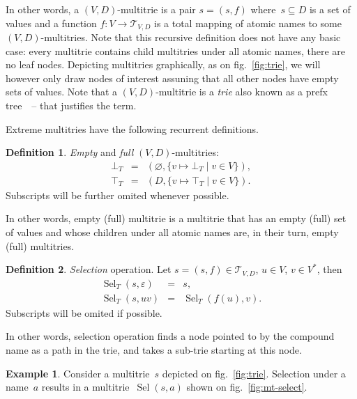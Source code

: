 \documentclass{article}
\theoremstyle{definition}
\newtheorem{Df}{Definition}
\newtheorem{Ex}{Example}
\newcommand{\setcharmt}{T}
\newcommand{\setsymbol}[3]{\mathcal{#1}_{#2,#3}}
\newcommand{\setmt}[2]{\setsymbol{\setcharmt}{#1}{#2}}
\newcommand{\select}{\operatorname{Sel}}
\begin{document}

In other words, a $(V,D)$-multitrie is a pair $s = (s, f)$ where~$s\subseteq D$
is a set of values and a function $f: V \to \setmt{V}{D}$ is a total mapping of
atomic names to some $(V,D)$-multitries. Note that this recursive definition does
not have any basic case: every multitrie contains child multitries
under all atomic names, there are no leaf nodes.
Depicting multitries graphically, as on fig.~\ref{fig:trie}, we will however
only draw nodes of interest assuning that all other nodes have empty sets of
values.  Note that a $(V,D)$-multitrie is a \emph{trie} also known as
a prefx tree~\cite{bib:knuth-trie}~-- that justifies the term.

Extreme multitries have the following recurrent definitions.
\begin{Df}\label{df:mt-extreme}
\emph{Empty} and \emph{full} $(V,D)$-multitries:
\begin{eqnarray*}
  \bot_\setcharmt & = &
      ( \varnothing, \{ v \mapsto \bot_\setcharmt \mid v\in V \} ) , \\
  \top_\setcharmt & = &
      ( D,           \{ v \mapsto \top_\setcharmt \mid v\in V \} ) .
\end{eqnarray*}
Subscripts will be further omited whenever possible.
\end{Df}
In other words, empty (full) multitrie is a multitrie that has an empty
(full) set of values and whose children under all atomic names are, in their
turn, empty (full) multitries.

\begin{Df}\label{df:mt-select}
\emph{Selection} operation. Let $s=(s,f) \in \setmt{V}{D}$, $u\in V$,
$v\in V^\ast$, then
\begin{eqnarray*}
  \select_\setcharmt(s, \varepsilon) & = & s , \\
  \select_\setcharmt(s, u v) & = & \select_\setcharmt(f(u), v) .
\end{eqnarray*}
Subscripts will be omited if possible.
\end{Df}

In other words, selection operation finds a node pointed to by the
compound name as a path in the trie, and takes a sub-trie starting
at this node.

\begin{Ex}\label{ex:mt-select}
Consider a multitrie~$s$ depicted on fig.~\ref{fig:trie}. Selection under a
name~$a$ results in a multitrie~$\select(s,a)$ shown on
fig.~\ref{fig:mt-select}.
\end{Ex}
\end{document}
